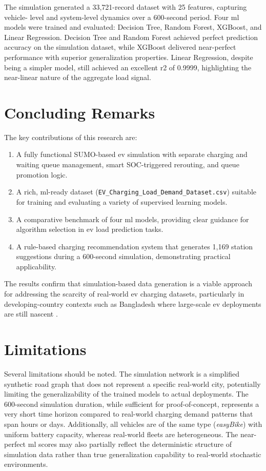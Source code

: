 \documentclass{thesis-library}
\begin{document}
The simulation generated a 33,721-record dataset with 25 features, capturing vehicle-
level and system-level dynamics over a 600-second period. Four \Gls{ml} models were
trained and evaluated: Decision Tree, Random Forest, XGBoost, and Linear Regression.
Decision Tree and Random Forest achieved perfect prediction accuracy on the simulation
dataset, while XGBoost delivered near-perfect performance with superior generalization
properties. Linear Regression, despite being a simpler model, still achieved an excellent
\Gls{r2} of 0.9999, highlighting the near-linear nature of the aggregate load signal.

\section{Concluding Remarks}

The key contributions of this research are:

\begin{enumerate}
  \item A fully functional SUMO-based \Gls{ev} simulation with separate charging and
        waiting queue management, smart SOC-triggered rerouting, and queue promotion
        logic.
  \item A rich, \Gls{ml}-ready dataset (\texttt{EV\_Charging\_Load\_Demand\_Dataset.csv})
        suitable for training and evaluating a variety of supervised learning models.
  \item A comparative benchmark of four \Gls{ml} models, providing clear guidance for
        algorithm selection in \Gls{ev} load prediction tasks.
  \item A rule-based charging recommendation system that generates 1,169 station
        suggestions during a 600-second simulation, demonstrating practical applicability.
\end{enumerate}

The results confirm that simulation-based data generation is a viable approach for
addressing the scarcity of real-world \Gls{ev} charging datasets, particularly in
developing-country contexts such as Bangladesh where large-scale \Gls{ev} deployments
are still nascent \cite{ev_bangladesh2023}.

\section{Limitations}

Several limitations should be noted. The simulation network is a simplified synthetic
road graph that does not represent a specific real-world city, potentially limiting the
generalizability of the trained models to actual deployments. The 600-second simulation
duration, while sufficient for proof-of-concept, represents a very short time horizon
compared to real-world charging demand patterns that span hours or days. Additionally, all
vehicles are of the same type (\textit{easyBike}) with uniform battery capacity, whereas
real-world fleets are heterogeneous. The near-perfect \Gls{ml} scores may also partially
reflect the deterministic structure of simulation data rather than true generalization
capability to real-world stochastic environments.
\end{document}
